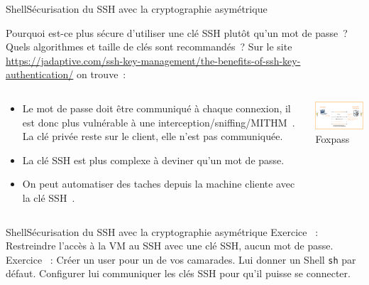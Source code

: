 \documentclass{beamer}
\begin{document}
    \begin{frame}{Shell}{Sécurisation du SSH avec la cryptographie asymétrique}
        \begin{small}
            Pourquoi est-ce plus sécure d'utiliser une clé SSH plutôt qu'un mot de passe~?
            \bigbreak
            Quels algorithmes et taille de clés sont recommandés~?
            \pause
            \bigbreak
            Sur le site \url{https://jadaptive.com/ssh-key-management/the-benefits-of-ssh-key-authentication/} on trouve~:
            \begin{columns}
                \begin{column}{0.6\textwidth}
                    \begin{itemize}
                        \item Le mot de passe doit être communiqué à chaque connexion, il est donc plus vulnérable à une interception/sniffing/MITHM~.
                        La clé privée reste sur le client, elle n'est pas communiquée.
                        \item La clé SSH est plus complexe à deviner qu'un mot de passe.
                        \item On peut automatiser des taches depuis la machine cliente avec la clé SSH~.
                    \end{itemize}
                \end{column}
                \begin{column}{0.4\textwidth}
                    \centering
                    \includegraphics[width=5cm]{image/ssh-key-diagram} \\ Foxpass\footnotemark \\
                \end{column}
            \end{columns}
        \end{small}
    \end{frame}

    \begin{frame}{Shell}{Sécurisation du SSH avec la cryptographie asymétrique}
        Exercice \execcounterdispinc{}~:
        Restreindre l'accès à la VM au SSH avec une clé SSH, aucun mot de passe.
        \bigbreak
        Exercice \execcounterdispinc{}~:
        Créer un user pour un de vos camarades.
        Lui donner un Shell \lstinline{sh} par défaut.
        Configurer lui communiquer les clés SSH pour qu'il puisse se connecter.
    \end{frame}
\end{document}
